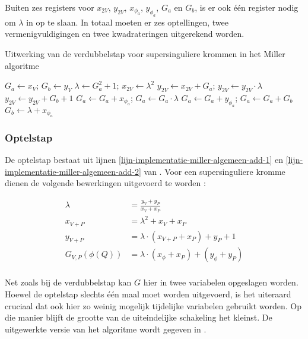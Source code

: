 Buiten zes registers voor $x_{2V}$, $y_{2V}$, $x_{\phi_a}$, $y_{\phi_a}$, $G_a$ en $G_b$, is er ook \'e\'en register nodig om $\lambda$ in op te slaan. In totaal moeten er zes optellingen, twee vermenigvuldigingen en twee kwadrateringen uitgerekend worden.

\begin{algorithm}[h]
	\caption{Uitwerking van de verdubbelstap voor supersinguliere krommen in het Miller algoritme}
	\label{algoritme-implementatie-miller-double-detail}
	$G_a \gets x_V$; $G_b \gets y_V$\;
	$\lambda \gets G_a^2 + 1$; $x_{2V} \gets \lambda ^2$\;
	$y_{2V} \gets x_{2V} + G_a$; $y_{2V} \gets y_{2V} \cdot \lambda$\;
	$y_{2V} \gets y_{2V} + G_b + 1$\;
	$G_a \gets G_a + x_{\phi_a}$; $G_a \gets G_a \cdot \lambda$\;
	$G_a \gets G_a + y_{\phi_a}$; $G_a \gets G_a + G_b$\;
	$G_b \gets \lambda + x_{\phi_a}$\;
\end{algorithm}

\subsubsection{Optelstap}

De optelstap bestaat uit lijnen \ref{lijn-implementatie-miller-algemeen-add-1} en \ref{lijn-implementatie-miller-algemeen-add-2} van . Voor een supersinguliere kromme dienen de volgende bewerkingen uitgevoerd te worden \cite{bertoni, hankerson-book}:

\[\begin{aligned}
	\lambda &= \frac{y_V + y_P}{x_V + x_P}\\
	x_{V + P} &= \lambda ^2 + x_V + x_P\\
	y_{V + P} &= \lambda \cdot (x_{V + P} + x_P) + y_P + 1\\
	G_{V,P}(\phi(Q)) &= \lambda \cdot (x_{\phi} + x_P) + (y_{\phi} + y_P)\\
\end{aligned}\]

Net zoals bij de verdubbelstap kan $G$ hier in twee variabelen opgeslagen worden. Hoewel de optelstap slechts \'e\'en maal moet worden uitgevoerd, is het uiteraard cruciaal dat ook hier zo weinig mogelijk tijdelijke variabelen gebruikt worden. Op die manier blijft de grootte van de uiteindelijke schakeling het kleinst. De uitgewerkte versie van het algoritme wordt gegeven in .

